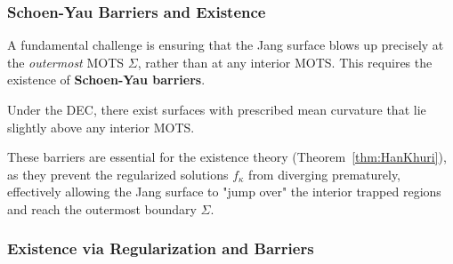 \subsubsection{Schoen-Yau Barriers and Existence}

A fundamental challenge is ensuring that the Jang surface blows up precisely at the \emph{outermost} MOTS $\Sigma$, rather than at any interior MOTS. This requires the existence of \textbf{Schoen-Yau barriers}.

\begin{theorem}\label{thm:SY_Barriers}
Under the DEC, there exist surfaces with prescribed mean curvature that lie slightly above any interior MOTS.
\end{theorem}
These barriers are essential for the existence theory (Theorem~\ref{thm:HanKhuri}), as they prevent the regularized solutions $f_\kappa$ from diverging prematurely, effectively allowing the Jang surface to "jump over" the interior trapped regions and reach the outermost boundary $\Sigma$.

\subsubsection{Existence via Regularization and Barriers}

